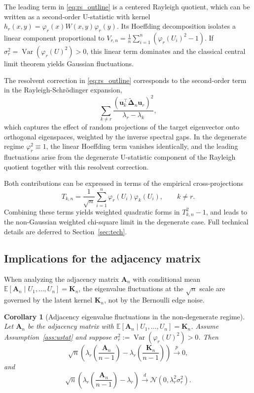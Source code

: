 \documentclass[11pt]{article}
\theoremstyle{plain}
\newtheorem{corollary}[theorem]{Corollary}
\theoremstyle{remark}
\DeclareMathOperator{\Var}{Var}
\begin{document}
The leading term in \eqref{eq:rs_outline} is a centered Rayleigh quotient,
which can be written as a second-order U-statistic with kernel
$h_r(x,y)=\varphi_r(x)W(x,y)\varphi_r(y)$. Its Hoeffding decomposition
isolates a linear component proportional to
$V_{r,n}=\frac1n\sum_{i=1}^n(\varphi_r(U_i)^2-1)$.
If $\sigma_r^2=\Var(\varphi_r(U)^2)>0$, this linear term dominates and
the classical central limit theorem yields Gaussian fluctuations.

The resolvent correction in \eqref{eq:rs_outline} corresponds to the
second-order term in the Rayleigh-Schrödinger expansion,
\[
\sum_{k\neq r}
\frac{
(\mathbf u_k^\top \widetilde{\mathbf\Delta}_n \mathbf u_r)^2
}{
\lambda_r-\lambda_k
},
\]
which captures the effect of random projections of the target eigenvector
onto orthogonal eigenspaces, weighted by the inverse spectral gaps.
In the degenerate regime $\varphi_r^2\equiv1$, the linear Hoeffding term
vanishes identically, and the leading fluctuations arise from the
degenerate U-statistic component of the Rayleigh quotient together with
this resolvent correction.

Both contributions can be expressed in terms of the empirical
cross-projections
\[
T_{k,n}=\frac{1}{\sqrt n}\sum_{i=1}^n
\varphi_r(U_i)\varphi_k(U_i),
\qquad k\neq r.
\]
Combining these terms yields weighted quadratic forms in
$T_{k,n}^2-1$, and leads to the non-Gaussian weighted chi-square limit in
the degenerate case. Full technical details are deferred to
Section~\ref{sec:tech}.



\subsection{Implications for the adjacency matrix}
When analyzing the adjacency matrix $\mathbf{A}_n$ with conditional mean $\mathbb{E}[\mathbf{A}_n\mid U_1,\dots,U_n]=\mathbf{K}_n$, 
the eigenvalue fluctuations at the $\sqrt{n}$ scale are governed by the latent kernel $\mathbf{K}_n$, not by the Bernoulli edge noise.
\begin{corollary}[Adjacency eigenvalue fluctuations in the non-degenerate regime]
\label{cor:edge_noise}
Let $\mathbf{A}_n$ be the adjacency matrix with $\mathbb{E}[\mathbf{A}_n\mid U_1,\dots,U_n]=\mathbf{K}_n$.
Assume Assumption~\ref{ass:ustat} and suppose $\sigma_r^2:=\Var(\varphi_r(U)^2)>0$.
Then
\[
\sqrt{n}\left(
\lambda_r\!\left(\frac{\mathbf{A}_n}{n-1}\right)
-
\lambda_r\!\left(\frac{\mathbf{K}_n}{n-1}\right)
\right)
\overset{p}{\longrightarrow} 0,
\]
and
\[
\sqrt{n}\left(
\lambda_r\!\left(\frac{\mathbf{A}_n}{n-1}\right)
-
\lambda_r
\right)
\xrightarrow{d}
\mathcal{N}\!\left(0,\lambda_r^2\sigma_r^2\right).
\]
\end{corollary}
\end{document}
